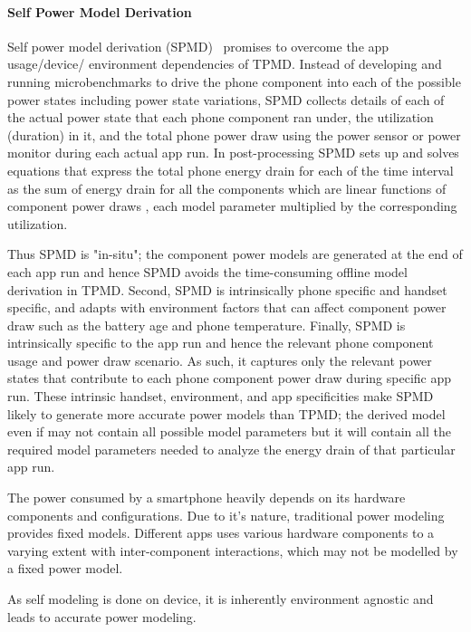 \paragraph{Self Power Model Derivation}
\label{subsec:spmd}
%
Self power model derivation (SPMD)~\cite{dong2011self} promises to overcome 
the app usage/device/ environment dependencies of TPMD. 
Instead of developing and running microbenchmarks to drive the 
phone component into each of the possible power states including 
power state variations, SPMD collects details of each of the 
actual power state that each phone component ran under, the 
utilization (duration) in it, and the total phone power draw 
using the power sensor or power monitor  during each actual 
app run. In post-processing SPMD sets up and solves equations 
that express the total phone energy drain for each of the time 
interval as the sum of energy drain for all the components which 
are linear functions of component power draws
, \ie each model parameter multiplied by the corresponding utilization.

Thus SPMD is "in-situ"; the component power models are generated 
at the end of each app run and hence SPMD avoids the time-consuming 
offline model derivation in TPMD.
Second, SPMD is intrinsically phone specific and handset specific, 
and adapts with environment factors that can affect component power 
draw such as the battery age and phone temperature. 
Finally, SPMD is intrinsically specific to
the app run and hence the relevant phone component usage and power 
draw scenario. As such,
{it captures only the relevant power states that contribute to each 
phone component power draw during specific app run.} 
These intrinsic handset, environment, and app specificities make SPMD 
likely to generate more accurate power models than TPMD; the 
derived model  even if may not contain all possible model parameters 
but it will contain all the required model parameters needed to analyze 
the energy drain of that particular app run. 


The power consumed by a smartphone heavily depends on its hardware components and configurations.
Due to it's nature, traditional power modeling provides fixed models.
Different apps uses various hardware components to a varying extent with inter-component interactions, which may not be modelled by a fixed power model.

As self modeling is done on device, it is inherently environment agnostic and leads to accurate power modeling.

\fi



